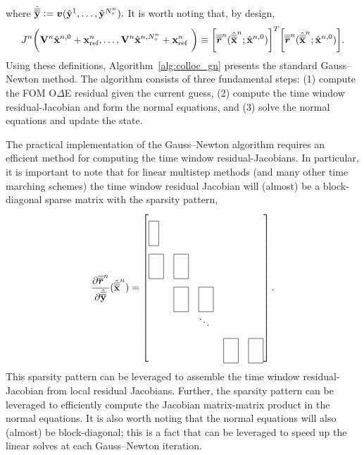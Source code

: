 where $\hat{\overline{\overline{\mathbf{y}}}}^{} \vcentcolon= \boldsymbol v (\hat{\mathbf{y}}^{1},\ldots,\hat{\mathbf{y}}^{N_{\tau}^{n}} ).$
It is worth noting that, by design,
\begin{equation*}
J_{}^{n} \bigg( \mathbf {V}^{n} \hat{\mathbf{x}}^{n,0} + \mathbf{x}_\text{ref}^{n},\ldots,\mathbf {V}^{n} \hat{\mathbf{x}}^{n,N_{\tau}^{n}} + \mathbf{x}_\text{ref}^{n} \ \bigg) 
\equiv
\bigg[\overline{\overline{\boldsymbol r}}^{n}_{\text{}}  (\hat{\overline{\overline{\mathbf {x}}}}^{n};\hat{\mathbf{x}}^{n,0}) \bigg]^T \bigg[ \overline{\overline{\boldsymbol r}}^{n}_{\text{}}(\hat{\overline{\overline{\mathbf {x}}}}^{n};\hat{\mathbf{x}}^{n,0}) \bigg].
\end{equation*} 
Using these definitions, Algorithm~\ref{alg:colloc_gn} presents the standard Gauss--Newton method. The algorithm consists of three fundamental steps: (1) compute the FOM O$\Delta$E residual given the current guess, (2) compute the time window residual-Jacobian and form the normal equations, and (3) solve the normal equations and update the state. 

The practical implementation of the Gauss--Newton algorithm requires an efficient method for computing the time window residual-Jacobians. In particular, it is important to note that for linear multistep methods (and many other time marching schemes) the time window residual Jacobian will (almost) be a block-diagonal 
sparse matrix with the sparsity pattern,
\begin{equation*}
\frac{\partial \residLMSSlabArg{n}}{\partial \genstatecollocMatySlabArg{}}(\genstatecollocMatSlabArg{n})  =
 \begin{bmatrix*}[l]
\matshapeb & \\%
 \matshapea & \matshapea & \\%
 & \matshapea  & \matshapea & \\%
&  & \ddots & \\%
 & &  & \matshapea &  \matshapea 
\end{bmatrix*}.
\end{equation*}
This sparsity pattern can be leveraged to assemble the time window residual-Jacobian from local residual Jacobians. 
Further, the sparsity pattern can be 
leveraged to efficiently compute the Jacobian matrix-matrix product in the normal equations.
It is also worth noting that the 
normal equations will also (almost) be block-diagonal; this is a fact that can be leveraged to speed up the linear solves at each Gauss--Newton iteration.

